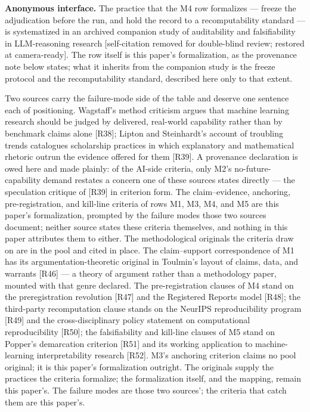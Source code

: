 \documentclass[11pt,a4paper]{article}
\begin{document}
\textbf{Anonymous interface.} The practice that the M4 row formalizes — freeze the adjudication before the run, and hold the record to a recomputability standard — is systematized in an archived companion study of auditability and falsifiability in LLM-reasoning research [self-citation removed for double-blind review; restored at camera-ready]. The row itself is this paper's formalization, as the provenance note below states; what it inherits from the companion study is the freeze protocol and the recomputability standard, described here only to that extent.

Two sources carry the failure-mode side of the table and deserve one sentence each of positioning. Wagstaff's method criticism argues that machine learning research should be judged by delivered, real-world capability rather than by benchmark claims alone [R38]; Lipton and Steinhardt's account of troubling trends catalogues scholarship practices in which explanatory and mathematical rhetoric outrun the evidence offered for them [R39]. A provenance declaration is owed here and made plainly: of the AI-side criteria, only M2's no-future-capability demand restates a concern one of these sources states directly — the speculation critique of [R39] in criterion form. The claim–evidence, anchoring, pre-registration, and kill-line criteria of rows M1, M3, M4, and M5 are this paper's formalization, prompted by the failure modes those two sources document; neither source states these criteria themselves, and nothing in this paper attributes them to either. The methodological originals the criteria draw on are in the pool and cited in place. The claim–support correspondence of M1 has its argumentation-theoretic original in Toulmin's layout of claims, data, and warrants [R46] — a theory of argument rather than a methodology paper, mounted with that genre declared. The pre-registration clauses of M4 stand on the preregistration revolution [R47] and the Registered Reports model [R48]; the third-party recomputation clause stands on the NeurIPS reproducibility program [R49] and the cross-disciplinary policy statement on computational reproducibility [R50]; the falsifiability and kill-line clauses of M5 stand on Popper's demarcation criterion [R51] and its working application to machine-learning interpretability research [R52]. M3's anchoring criterion claims no pool original; it is this paper's formalization outright. The originals supply the practices the criteria formalize; the formalization itself, and the mapping, remain this paper's. The failure modes are those two sources'; the criteria that catch them are this paper's.
\end{document}
